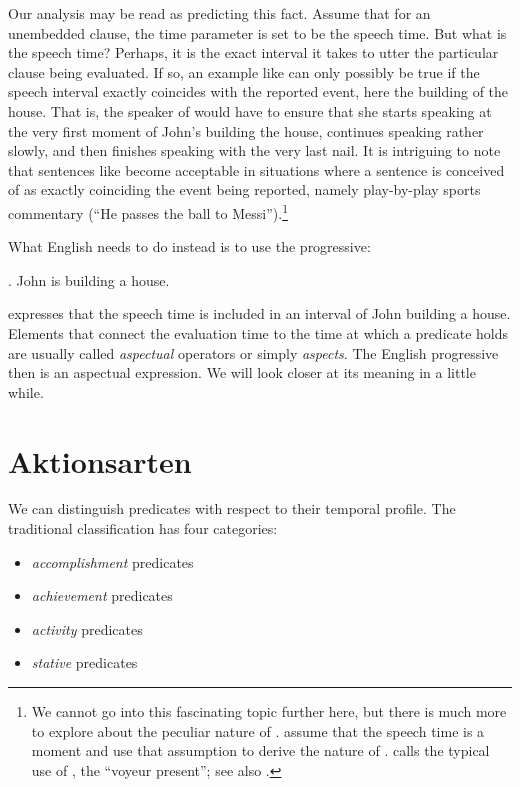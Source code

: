 Our analysis may be read as predicting this fact. Assume that for an unembedded clause, the time parameter is set to be the speech time. But what is the speech time? Perhaps, it is the exact interval it takes to utter the particular clause being evaluated. If so, an example like \Last can only possibly be true if the speech interval exactly coincides with the reported event, here the building of the house. That is, the speaker of \Last would have to ensure that she starts speaking at the very first moment of John's building the house, continues speaking rather slowly, and then finishes speaking with the very last nail. It is intriguing to note that sentences like \Last become acceptable in situations where a sentence is conceived of as exactly coinciding the event being reported, namely play-by-play sports commentary (``He passes the ball to Messi'').\footnote{We cannot go into this fascinating topic further here, but there is much more to explore about the peculiar nature of \Last. \citet{bennett-partee:1978:tense-aspect} assume that the speech time is a moment and use that assumption to derive the nature of \Last. \citet{ejerhed:1974:tense} calls the typical use of \Last, the ``voyeur present''; see also \citealt{cooper:1986:tense}.}

What English needs to do instead is to use the progressive:

\ex. John is building a house.

\Last expresses that the speech time is included in an interval of John building a house. Elements that connect the evaluation time to the time at which a predicate holds are usually called \emph{aspectual} operators or simply \emph{aspects}. The English progressive then is an aspectual expression. We will look closer at its meaning in a little while.

\section{Aktionsarten}

We can distinguish predicates with respect to their temporal profile. The traditional classification has four categories:

\begin{itemize}
	\item \emph{accomplishment} predicates
	\item \emph{achievement} predicates
	\item \emph{activity} predicates
	\item \emph{stative} predicates
\end{itemize}

